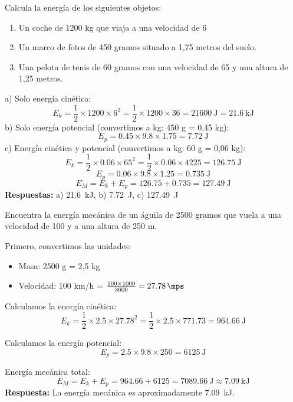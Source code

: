 \begin{exercise}
    Calcula la energía de los siguientes objetos:
    \begin{enumerate}[label=\alph*)]
\item Un coche de 1200 kg que viaja a una velocidad de \qty{6}{\mps}
\item Un marco de fotos de 450 gramos situado a 1,75 metros del suelo.
\item Una pelota de tenis de 60 gramos con una velocidad de \qty{65}{\mps} y una altura de 1,25 metros.
    \end{enumerate}
    \begin{solu}
        a) Solo energía cinética:
        \[
            E_k = \frac{1}{2} \times 1200 \times 6^2 = \frac{1}{2} \times 1200 \times 36 = \qty{21600}{\joule} = \qty{21.6}{\kilo\joule}
        \]
        b) Solo energía potencial (convertimos a kg: 450 g = 0,45 kg):
        \[
            E_p = 0.45 \times 9.8 \times 1.75 = \qty{7.72}{\joule}
        \]
        c) Energía cinética y potencial (convertimos a kg: 60 g = 0,06 kg):
        \[
            E_k = \frac{1}{2} \times 0.06 \times 65^2 = \frac{1}{2} \times 0.06 \times 4225 = \qty{126.75}{\joule}
        \]
        \[
            E_p = 0.06 \times 9.8 \times 1.25 = \qty{0.735}{\joule}
        \]
        \[
            E_M = E_k + E_p = 126.75 + 0.735 = \qty{127.49}{\joule}
        \]
        \textbf{Respuestas:} a) \qty{21.6}{\kilo\joule}, b) \qty{7.72}{\joule}, c) \qty{127.49}{\joule}
    \end{solu}
\end{exercise}

\begin{exercise}
    Encuentra la energía mecánica de un águila de 2500 gramos que vuela a una velocidad de \qty{100}{\kmph} y a una altura de 250 m.
    \begin{solu}
        Primero, convertimos las unidades:
        \begin{itemize}
            \item Masa: 2500 g = 2,5 kg
            \item Velocidad: 100 km/h = $\frac{100 \times 1000}{3600} = \qty{27.78}{\mps}$
        \end{itemize}
        Calculamos la energía cinética:
        \[
            E_k = \frac{1}{2} \times 2.5 \times 27.78^2 = \frac{1}{2} \times 2.5 \times 771.73 = \qty{964.66}{\joule}
        \]

        Calculamos la energía potencial:
        \[
            E_p = 2.5 \times 9.8 \times 250 = \qty{6125}{\joule}
        \]

        Energía mecánica total:
        \[
            E_M = E_k + E_p = 964.66 + 6125 = \qty{7089.66}{\joule} \approx \qty{7.09}{\kilo\joule}
        \]
        \textbf{Respuesta:} La energía mecánica es aproximadamente \qty{7.09}{\kilo\joule}.
    \end{solu}
\end{exercise}

